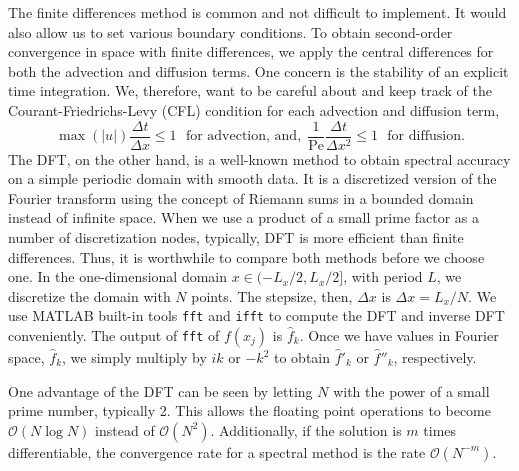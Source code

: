 The finite differences method is common and not difficult to implement. 
It would also allow us to set various boundary conditions. To obtain second-order convergence in space with finite differences, we apply the central differences for both the advection and diffusion terms. 
One concern is the stability of an explicit time integration. We, therefore, want to be careful about and keep track of the Courant-Friedrichs-Levy (CFL) condition for each advection and diffusion term,
\begin{equation}
	\max(|u|) \frac{\Delta t}{\Delta x}  \leq 1 \ \ \ \text{for advection, and,}
	\ \  \frac{1}{\text{Pe}}\frac{\Delta t}{\Delta x^2}  \leq 1 \ \ \ \text{for diffusion}.
\label{eq_CFL}	
\end{equation}
The DFT, on the other hand, is a well-known method to obtain spectral accuracy on a simple periodic domain with smooth data. It is a discretized version of the Fourier transform using the concept of Riemann sums in a bounded domain instead of infinite space. 
When we use a product of a small prime factor as a number of discretization nodes, typically, DFT is more efficient than finite differences. Thus, it is worthwhile to compare both methods before we choose one. 
In the one-dimensional domain $x \in (-L_x/2, L_x/2]$, with period $L$, we discretize the domain with $N$ points. The stepsize, then, $\Delta x$ is $ \Delta x = L_x/N$.
We use MATLAB built-in tools \verb+fft+ and \verb+ifft+ to compute the DFT and inverse DFT conveniently.
The output of \verb+fft+ of $f(x_j)$ is $\hat{f}_k$. Once we have values in Fourier space, $\hat{f}_k$, we simply multiply by $ik$ or $-k^2$ to obtain $\hat{f}'_k$ or $\hat{f}''_k$, respectively. 
\par
One advantage of the DFT can be seen by letting $N$ with the power of a small prime number, typically 2. This allows the floating point operations to become $\mathcal{O}(N \log N)$ instead of $\mathcal{O}(N^2)$. Additionally, if the solution is $m$ times differentiable, the convergence rate for a spectral method is the rate $\mathcal{O}(N^{-m})$. 
